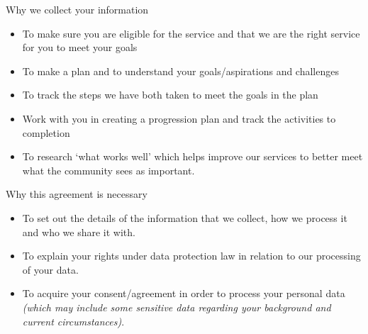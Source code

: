 \documentclass[a4paper,10pt]{article}
\begin{document}
\begin{mybox}{Why we collect your information}
\begin{small}
\begin{itemize}
     \item To make sure you are eligible for the service and that we are the right service for you to meet your goals
    \item To make a plan and to understand your goals/aspirations and challenges
    \item To track the steps we have both taken to meet the goals in the plan
    \item Work with you in creating a progression plan and track the activities to completion
    \item To research ‘what works well’ which helps improve our services to better meet what the community sees as important.
\end{itemize}
\end{small}
\end{mybox}

\begin{mybox}{Why this agreement is necessary}
\begin{small}
\begin{itemize}
    \item To set out the details of the information that we collect, how we process it and who we share it with.
    \item To explain your rights under data protection law in relation to our processing of your data.
    \item To acquire your consent/agreement in order to process your personal data \textit{(which may include some sensitive data regarding your background and current circumstances)}.
   \end{itemize} 
\end{small}

\end{mybox}
\end{document}
